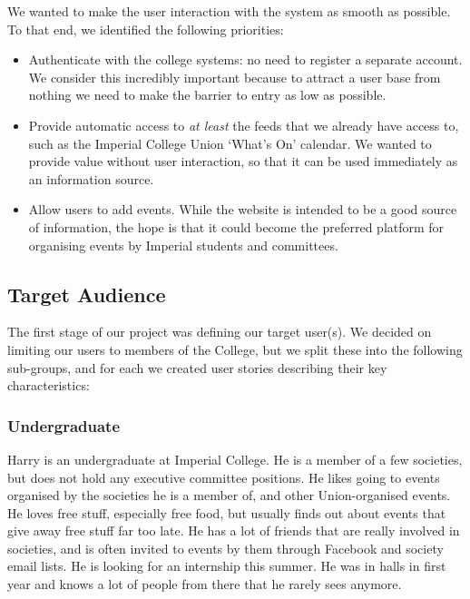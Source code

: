 \documentclass[11pt]{article}
\begin{document}
We wanted to make the user interaction with the system as smooth as possible. To that end, we identified the following priorities:

\begin{itemize}
\item Authenticate with the college systems: no need to register a separate account. We consider this incredibly important because to attract a user base from nothing we need to make the barrier to entry as low as possible.

\item Provide automatic access to \textit{at least} the feeds that we already have access to, such as the Imperial College Union `What's On' calendar. We wanted to provide value without user interaction, so that it can be used immediately as an information source.

\item Allow users to add events. While the website is intended to be a good source of information, the hope is that it could become the preferred platform for organising events by Imperial students and committees.
\end{itemize}

\subsection {Target Audience}

The first stage of our project was defining our target user(s). We decided on limiting our users to members of the College, but we split these into the following sub-groups, and for each we created user stories describing their key characteristics:

\subsubsection{Undergraduate}
Harry is an undergraduate at Imperial College. He is a member of a few societies, but does not hold any executive committee positions. He likes going to events organised by the societies he is a member of, and other Union-organised events. He loves free stuff, especially free food, but usually finds out about events that give away free stuff far too late. He has a lot of friends that are really involved in societies, and is often invited to events by them through Facebook and society email lists. He is looking for an internship this summer. He was in halls in first year and knows a lot of people from there that he rarely sees anymore.
\end{document}
